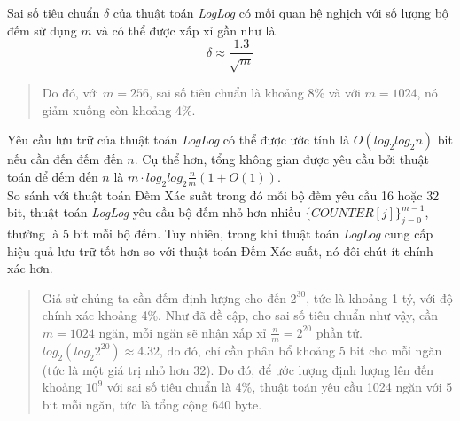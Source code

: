 \documentclass[letterpaper,13pt]{article}
\theoremstyle{mytheor}
\begin{document}
Sai số tiêu chuẩn $\delta$ của thuật toán \textit{LogLog} có mối quan hệ nghịch với số lượng bộ đếm sử dụng $m$ và có thể được xấp xỉ gần như là
\[\delta \approx \frac{1.3}{\sqrt{m}}\]
\vspace{0.25cm}
\begin{quote}
    Do đó, với $m = 256$, sai số tiêu chuẩn là khoảng 8\% và với $m = 1024$, nó giảm xuống còn khoảng 4\%.
    \vspace{0.25cm}
\end{quote}
\vspace{0.25cm}
\indent Yêu cầu lưu trữ của thuật toán \textit{LogLog} có thể được ước tính là $O(log_2log_2n)$ bit nếu cần đến đếm đến $n$. Cụ thể hơn, 
tổng không gian được yêu cầu bởi thuật toán để đếm đến $n$ là $m\cdot log_2log_2\frac{n}{m}(1 + O(1))$.\\
So sánh với thuật toán Đếm Xác suất trong đó mỗi bộ đếm yêu cầu 16 hoặc 32 bit, thuật toán \textit{LogLog} yêu cầu bộ đếm nhỏ hơn 
nhiều $\{COUNTER[j]\}_{j=0}^{m-1}$, thường là 5 bit mỗi bộ đếm. Tuy nhiên, trong khi thuật toán \textit{LogLog} cung cấp hiệu quả lưu trữ tốt hơn 
so với thuật toán Đếm Xác suất, nó đôi chút ít chính xác hơn.\\

\begin{quote}
    Giả sử chúng ta cần đếm định lượng cho đến $2^{30}$, tức là khoảng 1 tỷ, với độ chính xác khoảng 4\%. Như đã đề cập, cho sai số tiêu chuẩn như vậy, 
    cần $m = 1024$ ngăn, mỗi ngăn sẽ nhận xấp xỉ $\frac{n}{m} = 2^{20}$ phần tử.\\
    $log_2\left(log_{2}2^{20}\right) \approx 4.32$, do đó, chỉ cần phân bổ khoảng 5 bit cho mỗi ngăn (tức là một giá trị nhỏ hơn 32). 
    Do đó, để ước lượng định lượng lên đến khoảng $10^9$ với sai số tiêu chuẩn là 4\%, thuật toán yêu cầu 1024 ngăn với 5 bit mỗi ngăn, 
    tức là tổng cộng 640 byte.
    \vspace{0.25cm}
\end{quote}
\vspace{0.25cm}
\end{document}
